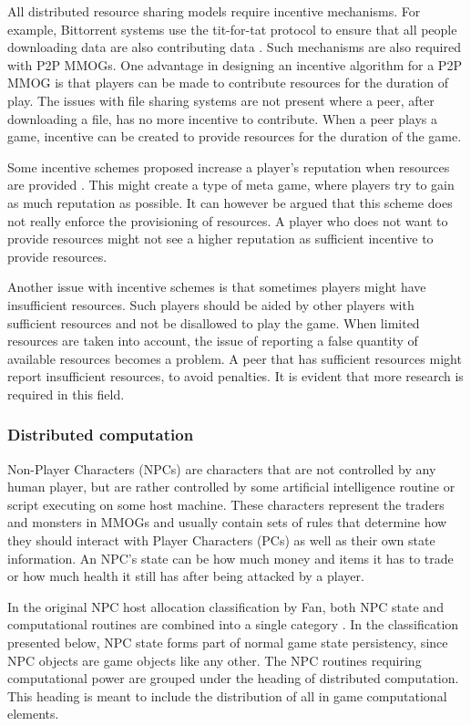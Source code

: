 \documentclass[10pt,a4paper,journal,cspaper,compsoc]{IEEEtran}
\begin{document}
All distributed resource sharing models require incentive mechanisms. For example, Bittorrent systems use the tit-for-tat protocol to ensure that all
people downloading data are also contributing data \cite{tit_for_tat}. Such mechanisms are also required with P2P MMOGs. One advantage in designing
an incentive algorithm for a P2P MMOG is that players can be made to contribute resources for the duration of play. The issues with file sharing
systems are not present where a peer, after downloading a file, has no more incentive to contribute. When a peer plays a game, incentive can be
created to provide resources for the duration of the game.

Some incentive schemes proposed increase a player's reputation when resources are provided \cite{classic_p2p_reputation} \cite{proactive_reputation}.
This might create a type of meta game, where players try to gain as much reputation as possible. It can however be argued that this scheme does not
really enforce the provisioning of resources. A player who does not want to provide resources might not see a higher reputation as sufficient
incentive to provide resources.

Another issue with incentive schemes is that sometimes players might have insufficient resources. Such players should be aided by other players with
sufficient resources and not be disallowed to play the game. When limited resources are taken into account, the issue of reporting a false quantity
of available resources becomes a problem. A peer that has sufficient resources might report insufficient resources, to avoid penalties. It is evident
that more research is required in this field.

\subsubsection{Distributed computation}

Non-Player Characters (NPCs) are characters that are not controlled by any human player, but are rather controlled by some artificial intelligence
routine or script executing on some host machine. These characters represent the traders and monsters in MMOGs and usually contain sets of rules that
determine how they should interact with Player Characters (PCs) as well as their own state information. An NPC's state can be how much money and
items it has to trade or how much health it still has after being attacked by a player.

In the original NPC host allocation classification by Fan, both NPC state and computational routines are combined into a single category
\cite{Fan_phd}. In the classification presented below, NPC state forms part of normal game state persistency, since NPC objects are game objects like
any other. The NPC routines requiring computational power are grouped under the heading of distributed computation. This heading is meant to include
the distribution of all in game computational elements.
\end{document}
